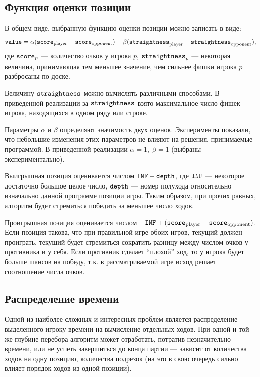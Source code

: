 \documentclass[a4paper]{article}
\begin{document}
\subsection{Функция оценки позиции}
В общем виде, выбранную функцию оценки позиции можно записать в виде:
$$\text{\tt value} = \alpha (\text{\tt score}_\text{player} - \text{\tt score}_\text{opponent}) + \beta (\text{\tt straightness}_\text{player} - \text{\tt straightness}_\text{opponent}),$$
где $\text{\tt score}_p$ --- количество очков у игрока $p$, $\text{\tt straightness}_p$ --- некоторая величина, принимающая тем меньшее значение, чем сильнее фишки игрока $p$ разбросаны по доске.

Величину $\text{\tt straightness}$ можно вычислять различными способами. В приведенной реализации за $\text{\tt straightness}$ взято максимальное число фишек игрока, находящихся в одном ряду или строке.

Параметры $\alpha$ и $\beta$ определяют значимость двух оценок. Эксперименты показали, что небольшие изменения этих параметров не влияют на решения, принимаемые программой. В приведенной реализации $\alpha=1,\; \beta=1$ (выбраны экспериментально).

Выигрышная позиция оценивается числом $\text{\tt INF} - \text{\tt depth}$, где $\text{\tt INF}$ --- некоторое достаточно большое целое число, $\text{\tt depth}$ --- номер полухода относительно изначально данной программе позиции игры. Таким образом, при прочих равных, алгоритм будет стремиться победить за меньшее число ходов.

Проигрышная позиция оценивается числом $- \text{\tt INF} + (\text{\tt score}_\text{player} - \text{\tt score}_\text{opponent})$. Если позиция такова, что при правильной игре обоих игров, текущий должен проиграть, текущий будет стремиться сократить разницу между числом очков у противника и у себя. Если противник сделает ``плохой'' ход, то у игрока будет больше шансов на победу, т.к. в рассматриваемой игре исход решает соотношение числа очков.

\subsection{Распределение времени}

Одной из наиболее сложных и интересных проблем является распределение выделенного игроку времени на вычисление отдельных ходов. При одной и той же глубине перебора алгоритм может отработать, потратив незначительно времени, или не успеть завершиться до конца партии --- зависит от количества ходов на одну позицию, количества подрезок (на это в свою очередь сильно влияет порядок ходов из одной позиции).
\end{document}
